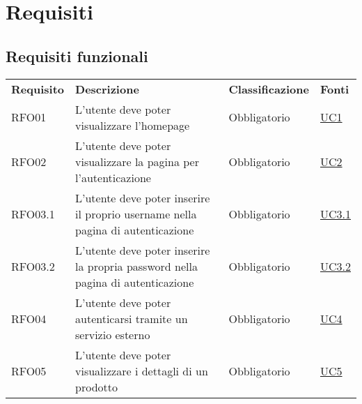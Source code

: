\section{Requisiti}
\subsection{Requisiti funzionali}
\begin{center}
    \centering
    \renewcommand{\arraystretch}{1.8}
    \label{tab:RequisitiFunzionali}
    \begin{longtable}[!h]{p{50px} p{200px} p{100px} p{50px}}
        \rowcolor{logo!70} \textbf{Requisito} & \textbf{Descrizione}                                                                             & \textbf{Classificazione} & \textbf{Fonti}                \\
        RFO01                                 & L'utente deve poter visualizzare l'homepage                                                      & Obbligatorio             & \hyperref[sec:UC1]{UC1}       \\
        RFO02                                 & L'utente deve poter visualizzare la pagina per l'autenticazione                                  & Obbligatorio             & \hyperref[sec:UC2]{UC2}       \\
        RFO03.1                               & L'utente deve poter inserire il proprio username nella pagina di autenticazione                  & Obbligatorio             & \hyperref[sec:UC3]{UC3.1}     \\
        RFO03.2                               & L'utente deve poter inserire la propria password nella pagina di autenticazione                  & Obbligatorio             & \hyperref[sec:UC3]{UC3.2}     \\
        RFO04                                 & L'utente deve poter autenticarsi tramite un servizio esterno                                     & Obbligatorio             & \hyperref[sec:UC4]{UC4}       \\
        RFO05                                 & L'utente deve poter visualizzare i dettagli di un prodotto                                       & Obbligatorio             & \hyperref[sec:UC5]{UC5}       \\

\end{longtable}
\end{center}
